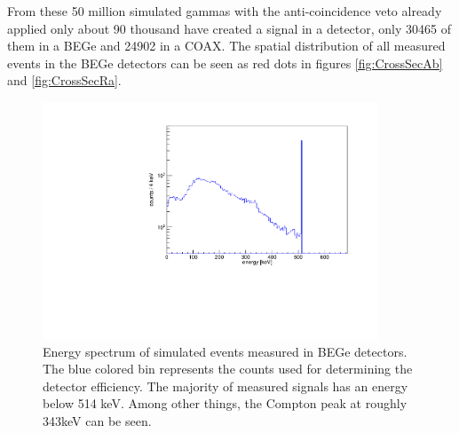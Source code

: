\documentclass[encoding=utf8,british]{tumphthesis}
\begin{document}
From these 50 million simulated gammas with the anti-coincidence veto already applied only about 90 thousand have created a signal in a detector, only 30465 of them in a BEGe and 24902 in a COAX.
The spatial distribution of all measured events in the BEGe detectors can be seen as red dots in figures \ref{fig:CrossSecAb} and \ref{fig:CrossSecRa}.

\begin{figure}[t!]
	\centering
	\ifmakefigures%
	\includegraphics[width=100mm]{./Bilder/MC-514-Phasenraum.pdf}
	\fi%
	\caption{
    Energy spectrum of simulated events measured in BEGe detectors.
	The blue colored bin represents the counts used for determining the detector efficiency.
	The majority of measured signals has an energy below 514 keV.
	Among other things, the Compton peak at roughly 343keV can be seen.  
	}
	\label{fig:PhasenraumMC514}
			\vspace{5mm}
\end{figure}
\end{document}
